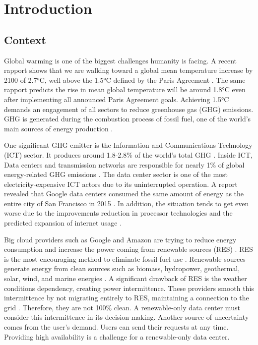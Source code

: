 \chapter{Introduction}
\label{cha:introduction}

\section{Context}

Global warming is one of the biggest challenges humanity is facing. A recent rapport shows that we are walking toward a global mean temperature increase by 2100 of 2.7°C, well above the 1.5°C defined by the Paris Agreement \cite{tracker2022projections}. The same rapport predicts the rise in mean global temperature will be around 1.8°C even after implementing all announced Paris Agreement goals. Achieving 1.5°C demands an engagement of all sectors to reduce greenhouse gas (GHG) emissions. GHG is generated during the combustion process of fossil fuel, one of the world's main sources of energy production \cite{olabi2022renewable}.

One significant GHG emitter is the Information and Communications Technology (ICT) sector. It produces around 1.8-2.8\% of the world's total GHG \cite{freitag2021climate}. Inside ICT, Data centers and transmission networks are responsible for nearly 1\% of global energy-related GHG emissions \cite{centres2022data}. The data center sector is one of the most electricity-expensive ICT actors due to its uninterrupted operation. A report revealed that Google data centers consumed the same amount of energy as the entire city of San Francisco in 2015 \cite{khan2018exploiting}. In addition, the situation tends to get even worse due to the improvements reduction in processor technologies and the predicted expansion of internet usage \cite{cisco2020cisco, freitag2021climate}.

Big cloud providers such as Google and Amazon are trying to reduce energy consumption and increase the power coming from renewable sources (RES) \cite{Masanet984}. RES is the most encouraging method to eliminate fossil
fuel use \cite{olabi2022renewable}. Renewable sources generate energy from clean sources such as biomass, hydropower, geothermal, solar, wind, and marine energies \cite{augustine2012renewable, panwar2011role, rostirolla2022survey, UNREnewable, gross2003progress}. A significant drawback of RES is the weather conditions dependency, creating power intermittence. These providers smooth this intermittence by not migrating entirely to RES, maintaining a connection to the grid \cite{rostirolla2022survey}. Therefore, they are not 100\% clean. A renewable-only data center must consider this intermittence in its decision-making. Another source of uncertainty comes from the user's demand. Users can send their requests at any time. Providing high availability is a challenge for a renewable-only data center.

